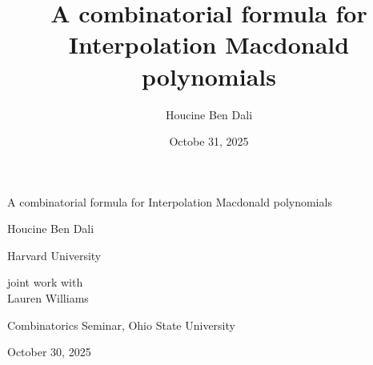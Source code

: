 \documentclass[10pt]{beamer}
\author[Houcine Ben Dali]{Houcine Ben Dali}
\title[Interpolation Macdonald polynomials]{A combinatorial formula for Interpolation Macdonald polynomials}
\date{Octobe 31, 2025}
\theoremstyle{definition}
\theoremstyle{remark}
\begin{document}
\begin{frame}[plain]



\vspace{1cm}
{\centering \textcolor{uiblink2}{\Large
A combinatorial formula for Interpolation Macdonald polynomials
}\par}


\vspace{0.25cm}
{\centering\large Houcine Ben Dali\\
\centering}
{\centering
Harvard University
\par}


\vspace{0.2cm}
{\centering joint work with\\
\large Lauren Williams

\centering}



 \vspace{0.4cm}
{\large \centering \textcolor{uibgreen}{Combinatorics Seminar, Ohio State University} \par}

\vspace{0.2cm}
{\large \centering  October $30$, 2025 \par}
\end{frame}
\end{document}
